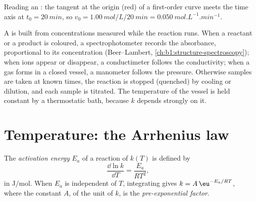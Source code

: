 \begin{omfigure}

{\small Reading an : the tangent at the origin (red) of a
first-order curve meets the time axis at $t_0 = \qty{20}{min}$, so $v_0 =
\qty{1.00}{mol/L}/\qty{20}{min} = \qty{0.050}{mol.L^{-1}.min^{-1}}$.}
\end{omfigure}

\begin{inthelab}
A  is built from concentrations measured while the reaction runs.
When a reactant or a product is coloured, a spectrophotometer records the
absorbance, proportional to its concentration (Beer--Lambert,
\cref{ch:b1:structure-spectroscopy}); when ions appear or disappear, a
conductimeter follows the conductivity; when a gas forms in a closed
vessel, a manometer follows the pressure. Otherwise samples are taken at
known times, the reaction is stopped (quenched) by cooling or dilution,
and each sample is titrated. The temperature of the vessel is held
constant by a thermostatic bath, because $k$ depends strongly on it.
\end{inthelab}

\section{Temperature: the Arrhenius law}

\begin{definition}\label{def:b1:rate-laws:activation-energy}
The \emph{activation energy} $E_a$ of a reaction
of  $k(T)$ is defined by
\[
  \frac{\dd \ln k}{\dd T} = \frac{E_a}{RT^2} ,
\]
in \unit{J/mol}. When $E_a$ is independent of $T$, integrating gives
$k = A\,\eu^{-E_a/RT}$, where the constant $A$, of the unit of $k$, is the
\emph{pre-exponential factor}.
\end{definition}

